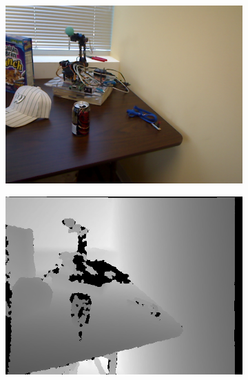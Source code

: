 \documentclass[preprint,10pt,5p,times,twocolumn]{elsarticle}
\begin{document}
\begin{figure}[t]
\begin{center}
\begin{subfigure}[b]{0.136\linewidth}
\end{subfigure}

\begin{subfigure}[b]{0.136\linewidth}
    \includegraphics[width=\linewidth]{table_structure_missing_color.png}
\end{subfigure}
\begin{subfigure}[b]{0.136\linewidth}
    \includegraphics[width=\linewidth]{table_structure_missing_depth.png}
\end{subfigure}
\begin{subfigure}[b]{0.136\linewidth}

\end{subfigure}
\end{center}
\end{figure}
\end{document}
